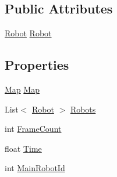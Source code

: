 \subsection*{Public Attributes}
\begin{DoxyCompactItemize}
\item 
\hyperlink{classgearit_1_1src_1_1robot_1_1_robot}{Robot} \hyperlink{classgearit_1_1src_1_1_genetic_algorithm_1_1_genetic_game_a4a8a37d8fad07e44afc767d9076cd52b}{Robot}
\end{DoxyCompactItemize}
\subsection*{Properties}
\begin{DoxyCompactItemize}
\item 
\hyperlink{classgearit_1_1src_1_1map_1_1_map}{Map} \hyperlink{classgearit_1_1src_1_1_genetic_algorithm_1_1_genetic_game_a2de327be827b8c8d428e91c689c710b0}{Map}
\item 
List$<$ \hyperlink{classgearit_1_1src_1_1robot_1_1_robot}{Robot} $>$ \hyperlink{classgearit_1_1src_1_1_genetic_algorithm_1_1_genetic_game_a827b277ecdca639d739e26d891f4c755}{Robots}
\item 
int \hyperlink{classgearit_1_1src_1_1_genetic_algorithm_1_1_genetic_game_a630e9e03114a535553fda264005ab236}{Frame\+Count}
\item 
float \hyperlink{classgearit_1_1src_1_1_genetic_algorithm_1_1_genetic_game_a29c0759ad3131b8baec183af6472dd90}{Time}
\item 
int \hyperlink{classgearit_1_1src_1_1_genetic_algorithm_1_1_genetic_game_a21bd0ca9c29a9c1b8eb301c52b02cc41}{Main\+Robot\+Id}
\end{DoxyCompactItemize}


